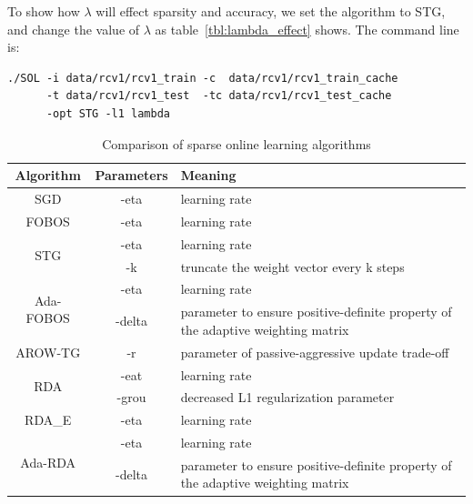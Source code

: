 \documentclass[11pt,a4paper]{article}
\begin{document}
To show how $\lambda$ will effect sparsity and accuracy, we set the algorithm
to STG, and change the value of $\lambda$ as table~\ref{tbl:lambda_effect} shows.
The command line is:
\lstset{language=bash,}
\begin{lstlisting}
./SOL -i data/rcv1/rcv1_train -c  data/rcv1/rcv1_train_cache 
      -t data/rcv1/rcv1_test  -tc data/rcv1/rcv1_test_cache 
      -opt STG -l1 lambda
\end{lstlisting}
\begin{table}[!t]
            \renewcommand{\arraystretch}{1.3}
            \caption{Comparison of sparse online learning algorithms}
            \label{tbl:param_illustrate}
            \centering
            \begin{tabular}{|c|c|p{9cm}|}
                \hline
                Algorithm & Parameters & Meaning\\
                \hline
                SGD & -eta & learning rate \\
                \hline
                FOBOS & -eta & learning rate \\
                \hline
                \multirow{2}{*}{STG}& -eta & learning rate \\
                \cline{2-3}
                &-k & truncate the weight vector every k steps \\
                \hline
                \multirow{2}{*}{Ada-FOBOS}& -eta & learning rate \\
                \cline{2-3}
                & -delta & parameter to ensure positive-definite property of the adaptive weighting matrix \\
                \hline
                AROW-TG& -r &  parameter of passive-aggressive update trade-off\\
                \hline
                \multirow{2}{*}{RDA}&  -eat &  learning rate \\
                \cline{2-3}
                &-grou & decreased L1 regularization parameter \\
                \hline
                RDA\_E&  -eta & learning rate \\
                \hline
                \multirow{2}{*}{Ada-RDA}& -eta & learning rate \\
                \cline{2-3}
                & -delta & parameter to ensure positive-definite property of the adaptive weighting matrix \\
                \hline

\end{tabular}
\end{table}
\end{document}
